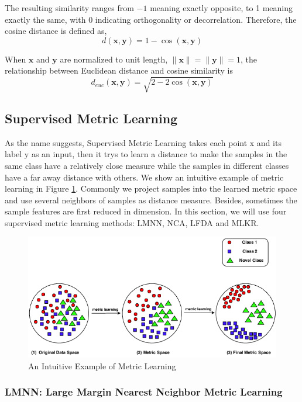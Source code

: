 The resulting similarity ranges from $-1$ meaning exactly opposite, to 1 meaning exactly the same, with 0 indicating orthogonality or decorrelation. Therefore, the cosine distance is defined as,
$$d(\mathbf{x},\mathbf{y})=1-\cos(\mathbf{x},\mathbf{y})$$

When $\mathbf{x}$ and $\mathbf{y}$ are normalized to unit length, $\|\mathbf{x}\|=\|\mathbf{y}\|=1$, the relationship between Euclidean distance and cosine similarity is
$$d_{euc}(\mathbf{x},\mathbf{y})=\sqrt{2-2\cos(\mathbf{x},\mathbf{y})}$$



\subsection{Supervised Metric Learning}
\label{supervised}
    As the name suggests, Supervised Metric Learning takes each point x and its label y as an input, then it trys to learn a distance to make the samples in the same class have a relatively close measure while the samples in different classes have a far away distance with others. We show an intuitive example of metric learning in Figure \ref{fig:ml}. Commonly we project samples into the learned metric space and use several neighbors of samples as distance measure. Besides, sometimes the sample features are first reduced in dimension. In this section, we will use four supervised metric learning methods: LMNN, NCA, LFDA and MLKR.
    
    \begin{figure}[htbp]
        \centering
        \includegraphics[width=0.7\linewidth]{img/metric-learning.png}
        \caption{An Intuitive Example of Metric Learning}
        \label{fig:ml}
    \end{figure}

\subsubsection{LMNN: Large Margin Nearest Neighbor Metric Learning}


